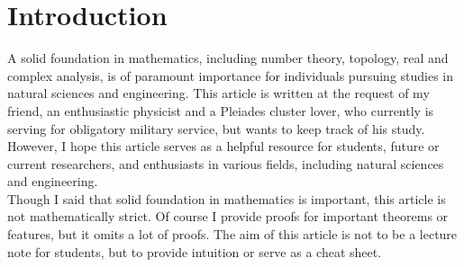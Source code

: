 \chapter{Introduction}
A solid foundation in mathematics, including number theory, topology, real and  complex analysis, is of paramount importance for individuals pursuing studies in natural sciences and engineering. This article is written at the request of my friend, an enthusiastic physicist and a Pleiades cluster lover, who currently is serving for obligatory military service, but wants to keep track of his study. However, I hope this article serves as a helpful resource for students, future or current researchers, and enthusiasts in various fields, including natural sciences and engineering. \\
Though I said that solid foundation in mathematics is important, this article is not mathematically strict. Of course I provide proofs for important theorems or features, but it omits a lot of proofs. The aim of this article is not to be a lecture note for students, but to provide intuition or serve as a cheat sheet.
\cite{temporary02}